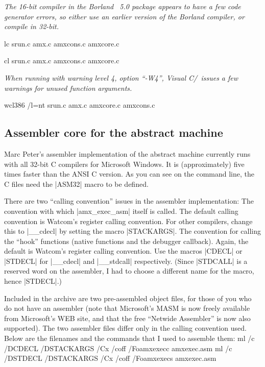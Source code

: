         {\it The 16-bit compiler in the Borland \Cpp\ 5.0 package appears to
        have a few code generator errors, so either use an earlier version of
        the Borland compiler, or compile in 32-bit.}

 \lbreak
        {\smalltt lc srun.c amx.c amxcons.c amxcore.c}

 \lbreak
        {\smalltt cl srun.c amx.c amxcons.c amxcore.c}

        {\it When running with warning level 4, option ``-W4'', Visual C/\Cpp\
        issues a few warnings for unused function arguments.}

 \lbreak
        {\smalltt wcl386 /l=nt srun.c amx.c amxcore.c amxcons.c}
\endlist

\subsection{Assembler core for the abstract machine}
Marc Peter's assembler implementation of the abstract machine currently runs
with all 32-bit C compilers for Microsoft Windows. It is (approximately) five
times faster than the ANSI C version. As you can see on the command line, the C
files need the |ASM32| macro to be defined.

There are two ``calling convention'' issues in the assembler implementation:
\beginlist{1em}\compactlist
\list{\lbullet}
  The convention with which |amx_exec_asm| itself is called. The default
  calling convention is Watcom's register calling convention. For other
  compilers, change this to |__cdecl| by setting the macro |STACKARGS|.
\list{\lbullet}
  The convention for calling the ``hook'' functions (native functions and
  the debugger callback). Again, the default is Watcom's register calling
  convention. Use the macros |CDECL| or |STDECL| for |__cdecl| and |__stdcall|
  respectively. (Since |STDCALL| is a reserved word on the assembler, I had
  to choose a different name for the macro, hence |STDECL|.)
\endlist

Included in the archive are two pre-assembled object files, for those of
you who do not have an assembler (note that Microsoft's MASM is now freely
available from Microsoft's WEB site, and that the free ``Netwide Assembler''
is now also supported). The two assembler files differ only
in the calling convention used. Below are the filenames and the commands
that I used to assemble them:
\beginlist{40pt}\compactlist
{} \lbreak
    {\smalltt ml /c /DCDECL /DSTACKARGS /Cx /coff /Foamxexecc amxexec.asm}
\list{{\tt AMXEXECS.OBJ} (__stdcall calling convention)} \lbreak
    {\smalltt ml /c /DSTDECL /DSTACKARGS /Cx /coff /Foamxexecs amxexec.asm}
\endlist

